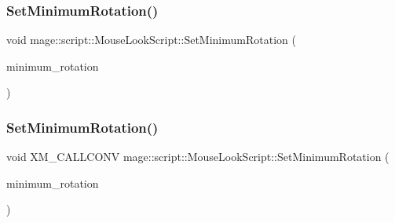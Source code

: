 \hypertarget{classmage_1_1script_1_1_mouse_look_script_ab901aa0a3d22ef1e28f00db6f4f99aa1}{}\label{classmage_1_1script_1_1_mouse_look_script_ab901aa0a3d22ef1e28f00db6f4f99aa1} 
\subsubsection{\texorpdfstring{Set\+Minimum\+Rotation()}{SetMinimumRotation()}\hspace{0.1cm}{\footnotesize\ttfamily [2/3]}}
{\footnotesize\ttfamily void mage\+::script\+::\+Mouse\+Look\+Script\+::\+Set\+Minimum\+Rotation (\begin{DoxyParamCaption}\item[{\hyperlink{namespacemage_aa87237ad091f5cd7da612b8523fc108f}{F32x2}}]{minimum\+\_\+rotation }\end{DoxyParamCaption})\hspace{0.3cm}{\ttfamily [noexcept]}}

\hypertarget{classmage_1_1script_1_1_mouse_look_script_ab120a7b0d01acb64ae4287d716d89a09}{}\label{classmage_1_1script_1_1_mouse_look_script_ab120a7b0d01acb64ae4287d716d89a09} 
\subsubsection{\texorpdfstring{Set\+Minimum\+Rotation()}{SetMinimumRotation()}\hspace{0.1cm}{\footnotesize\ttfamily [3/3]}}
{\footnotesize\ttfamily void X\+M\+\_\+\+C\+A\+L\+L\+C\+O\+NV mage\+::script\+::\+Mouse\+Look\+Script\+::\+Set\+Minimum\+Rotation (\begin{DoxyParamCaption}\item[{F\+X\+M\+V\+E\+C\+T\+OR}]{minimum\+\_\+rotation }\end{DoxyParamCaption})\hspace{0.3cm}{\ttfamily [noexcept]}}

\hypertarget{classmage_1_1script_1_1_mouse_look_script_a07c261e34b3131114efacb0d0f6ae076}{}\label{classmage_1_1script_1_1_mouse_look_script_a07c261e34b3131114efacb0d0f6ae076} 
